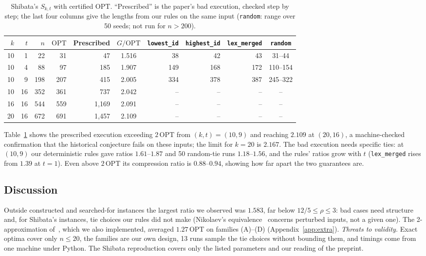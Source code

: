 \documentclass[11pt,a4paper]{article}   %
\theoremstyle{compact}
\theoremstyle{compactdef}
\newcommand{\OPT}{\mathrm{OPT}}
\newcommand{\GR}{G}                         %
\begin{document}
\begin{table}[h]\centering\small
\caption{Shibata's $S_{k,t}$ with certified $\OPT$. ``Prescribed'' is the
paper's bad execution, checked step by step; the last four columns give the
lengths from our rules on the same input (\texttt{random}: range over 50
seeds; not run for $n>200$).}\label{tab:shibata}
\setlength{\tabcolsep}{4pt}
\begin{tabular}{rrrrrcrrrc}
\toprule
$k$ & $t$ & $n$ & $\OPT$ & Prescribed & $\GR/\OPT$ & \texttt{lowest\_id} & \texttt{highest\_id} & \texttt{lex\_merged} & \texttt{random}\\
\midrule
10 & 1  & 22  & 31  & 47      & 1.516 & 38  & 42  & 43  & 31--44\\
10 & 4  & 88  & 97  & 185     & 1.907 & 149 & 168 & 172 & 110--154\\
10 & 9  & 198 & 207 & 415     & 2.005 & 334 & 378 & 387 & 245--322\\
10 & 16 & 352 & 361 & 737     & 2.042 & --  & --  & --  & --\\
16 & 16 & 544 & 559 & 1{,}169 & 2.091 & --  & --  & --  & --\\
20 & 16 & 672 & 691 & 1{,}457 & 2.109 & --  & --  & --  & --\\
\bottomrule
\end{tabular}
\end{table}

Table~\ref{tab:shibata} shows the prescribed execution exceeding $2\,\OPT$
from $(k,t)=(10,9)$ and reaching $2.109$ at $(20,16)$, a machine-checked
confirmation that the historical conjecture fails on these inputs; the
limit for $k=20$ is $2.167$. The bad execution needs specific ties: at
$(10,9)$ our deterministic rules gave ratios $1.61$--$1.87$ and 50
random-tie runs $1.18$--$1.56$, and the rules' ratios grow with $t$
(\texttt{lex\_merged} rises from $1.39$ at $t=1$). Even above $2\,\OPT$ its
compression ratio is $0.88$--$0.94$, showing how far apart the two
guarantees are.

\subsection{Discussion}
Outside constructed and searched-for instances the largest ratio we
observed was $1.583$, far below $12/5\le\rho\le3$: bad cases need structure
and, for Shibata's instances, tie choices our rules did not make
(Nikolaev's equivalence~\cite{Nik21} concerns perturbed inputs, not a given
one). The 2-approximation of~\cite{OAI26}, which we also implemented,
averaged $1.27\,\OPT$ on families (A)--(D) (Appendix~\ref{app:extra}).
\emph{Threats to validity.} Exact optima cover only $n\le20$, the families
are our own design, 13 runs sample the tie choices without bounding them,
and timings come from one machine under Python. The Shibata reproduction
covers only the listed parameters and our reading of the preprint.
\end{document}
